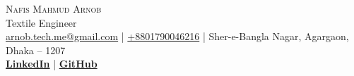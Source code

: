 
\begin{center}

	{\Huge \scshape {Nafis Mahmud Arnob}}\\
	\vspace{2mm}
	{\large Textile Engineer} \\
	\vspace{2mm}
	\href{mailto:arnob.tech.me@gmail.com}{arnob.tech.me@gmail.com} | \href{tel:+8801790046216}{+8801790046216} | Sher-e-Bangla Nagar, Agargaon, Dhaka – 1207\\
	\vspace{1mm}
	\textbf{\href{https://www.linkedin.com/in/arnob-mahmud/}{LinkedIn}} | \textbf{\href{https://www.github.com/ArnobMahmud}{GitHub}}\\

\end{center}